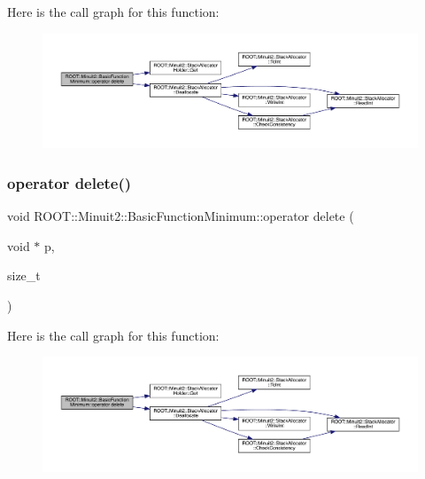 Here is the call graph for this function\+:
\nopagebreak
\begin{figure}[H]
\begin{center}
\leavevmode
\includegraphics[width=350pt]{de/d25/classROOT_1_1Minuit2_1_1BasicFunctionMinimum_ab9d53fd0c21ac6456afdb233e4cbaf1b_cgraph}
\end{center}
\end{figure}
\mbox{\label{classROOT_1_1Minuit2_1_1BasicFunctionMinimum_ab9d53fd0c21ac6456afdb233e4cbaf1b}} 
\subsubsection{\texorpdfstring{operator delete()}{operator delete()}\hspace{0.1cm}{\footnotesize\ttfamily [2/3]}}
{\footnotesize\ttfamily void R\+O\+O\+T\+::\+Minuit2\+::\+Basic\+Function\+Minimum\+::operator delete (\begin{DoxyParamCaption}\item[{void $\ast$}]{p,  }\item[{size\+\_\+t}]{ }\end{DoxyParamCaption})\hspace{0.3cm}{\ttfamily [inline]}}

Here is the call graph for this function\+:
\nopagebreak
\begin{figure}[H]
\begin{center}
\leavevmode
\includegraphics[width=350pt]{de/d25/classROOT_1_1Minuit2_1_1BasicFunctionMinimum_ab9d53fd0c21ac6456afdb233e4cbaf1b_cgraph}
\end{center}
\end{figure}
\mbox{\label{classROOT_1_1Minuit2_1_1BasicFunctionMinimum_ab9d53fd0c21ac6456afdb233e4cbaf1b}} 

